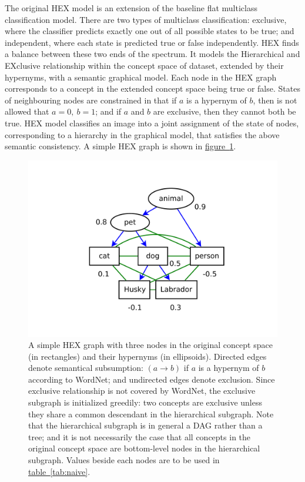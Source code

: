\documentclass[11pt,a4paper]{article}
\begin{document}
The original HEX model \cite{deng2014large} is an extension of the baseline flat multiclass classification model. There are two types of multiclass classification: exclusive, where the classifier predicts exactly one out of all possible states to be true; and independent, where each state is predicted true or false independently. HEX finds a balance between these two ends of the spectrum. It models the Hierarchical and EXclusive relationship within the concept space of dataset, extended by their hypernyms, with a semantic graphical model. Each node in the HEX graph corresponds to a concept in the extended concept space being true or false. States of neighbouring nodes are constrained in that if $a$ is a hypernym of $b$, then is not allowed that $a=0,\ b=1$; and if $a$ and $b$ are exclusive, then they cannot both be true. HEX model classifies an image into a joint assignment of the state of nodes, corresponding to a hierarchy in the graphical model, that satisfies the above semantic consistency. A simple HEX graph is shown in \hyperref[fig:naive]{figure~\ref{fig:naive}}.
\begin{figure}[htbp]
\centering
\includegraphics[scale=0.5]{naive.pdf}
\caption{A simple HEX graph with three nodes in the original concept space (in rectangles) and their hypernyms (in ellipsoids). Directed edges denote semantical subsumption: $(a\rightarrow b)$ if $a$ is a hypernym of $b$ according to WordNet; and undirected edges denote exclusion. Since exclusive relationship is not covered by WordNet, the exclusive subgraph is initialized greedily: two concepts are exclusive unless they share a common descendant in the hierarchical subgraph. Note that the hierarchical subgraph is in general a DAG rather than a tree; and it is not necessarily the case that all concepts in the original concept space are bottom-level nodes in the hierarchical subgraph. Values beside each nodes are to be used in \hyperref[tab:naive]{table~\ref{tab:naive}}.}
\label{fig:naive}
\end{figure}
\end{document}
